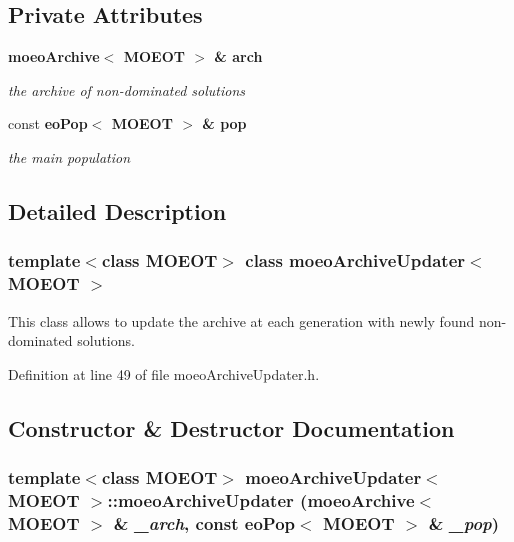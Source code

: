 \subsection*{Private Attributes}
\begin{CompactItemize}
\item 
\bf{moeo\-Archive}$<$ MOEOT $>$ \& \bf{arch}\label{classmoeoArchiveUpdater_64531e46898b0e2a4ec48ba28dbfd59d}

\begin{CompactList}\small\item\em the archive of non-dominated solutions \item\end{CompactList}\item 
const \bf{eo\-Pop}$<$ MOEOT $>$ \& \bf{pop}\label{classmoeoArchiveUpdater_a7ba8cde3727d1f24835083e85dfd70d}

\begin{CompactList}\small\item\em the main population \item\end{CompactList}\end{CompactItemize}


\subsection{Detailed Description}
\subsubsection*{template$<$class MOEOT$>$ class moeo\-Archive\-Updater$<$ MOEOT $>$}

This class allows to update the archive at each generation with newly found non-dominated solutions. 



Definition at line 49 of file moeo\-Archive\-Updater.h.

\subsection{Constructor \& Destructor Documentation}
\subsubsection{\setlength{\rightskip}{0pt plus 5cm}template$<$class MOEOT$>$ \bf{moeo\-Archive\-Updater}$<$ MOEOT $>$::\bf{moeo\-Archive\-Updater} (\bf{moeo\-Archive}$<$ MOEOT $>$ \& {\em \_\-arch}, const \bf{eo\-Pop}$<$ MOEOT $>$ \& {\em \_\-pop})\hspace{0.3cm}{\tt  [inline]}}\label{classmoeoArchiveUpdater_1497a2bc8df12565b3ea21bb8e08bee1}


